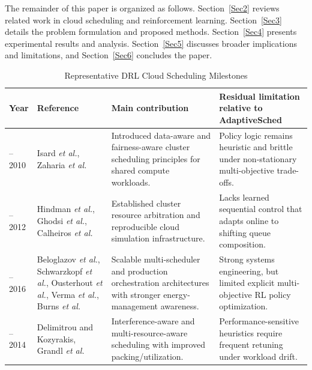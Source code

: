 \documentclass[journal]{IEEEtran}
\begin{document}
The remainder of this paper is organized as follows. Section~\ref{Sec2} reviews related work in cloud scheduling and reinforcement learning. Section~\ref{Sec3} details the problem formulation and proposed methods. Section~\ref{Sec4} presents experimental results and analysis. Section~\ref{Sec5} discusses broader implications and limitations, and Section~\ref{Sec6} concludes the paper.

\begin{table}[ht]
\centering
\caption{Representative DRL Cloud Scheduling Milestones}
\label{tab:relatedwork}
\small
\setlength{\tabcolsep}{4pt}
\renewcommand{\arraystretch}{1.15}
\begin{tabular}{|>{\centering\arraybackslash}m{2.0cm}|>{\raggedright\arraybackslash}m{3.0cm}|>{\raggedright\arraybackslash}m{6cm}|>{\raggedright\arraybackslash}m{5.6cm}|}
\hline
\textbf{Year} & \textbf{Reference} & \textbf{Main contribution} & \textbf{Residual limitation relative to AdaptiveSched} \\ \hline
2009--2010 & Isard \textit{et al.}, Zaharia \textit{et al.}~\cite{isard2009quincy, zaharia2010delay} & Introduced data-aware and fairness-aware cluster scheduling principles for shared compute workloads. & Policy logic remains heuristic and brittle under non-stationary multi-objective trade-offs. \\ \hline
2011--2012 & Hindman \textit{et al.}, Ghodsi \textit{et al.}, Calheiros \textit{et al.}~\cite{hindman2011mesos, ghodsi2011drf, calheiros2011cloudsim} & Established cluster resource arbitration and reproducible cloud simulation infrastructure. & Lacks learned sequential control that adapts online to shifting queue composition. \\ \hline
2012--2016 & Beloglazov \textit{et al.}, Schwarzkopf \textit{et al.}, Ousterhout \textit{et al.}, Verma \textit{et al.}, Burns \textit{et al.}~\cite{beloglazov2012energy, schwarzkopf2013omega, ousterhout2013sparrow, verma2015borg, burns2016borg} & Scalable multi-scheduler and production orchestration architectures with stronger energy-management awareness. & Strong systems engineering, but limited explicit multi-objective RL policy optimization. \\ \hline
2013--2014 & Delimitrou and Kozyrakis, Grandl \textit{et al.}~\cite{delimitrou2013paragon, delimitrou2014quasar, grandl2014tetris} & Interference-aware and multi-resource-aware scheduling with improved packing/utilization. & Performance-sensitive heuristics require frequent retuning under workload drift. \\ \hline

\end{tabular}
\end{table}
\end{document}

